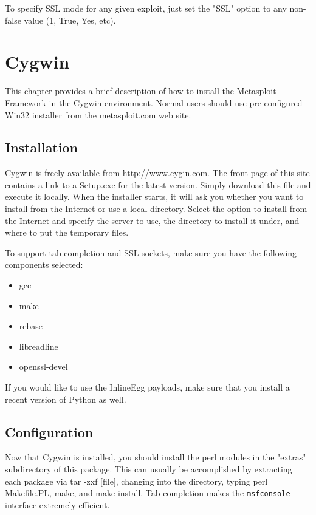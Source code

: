 \documentclass{report}
\begin{document}
\par
To specify SSL mode for any given exploit, just set the "SSL" option
to any non-false value (1, True, Yes, etc).


\pagebreak
\chapter{Cygwin}
\label{CYGWIN}	
	
\par
This chapter provides a brief description of how to install the Metasploit
Framework in the Cygwin environment. Normal users should use pre-configured
Win32 installer from the metasploit.com web site. 

	\section{Installation}
\par
Cygwin is freely available from \url{http://www.cygin.com}. The front page of
this site contains a link to a Setup.exe for the latest version. Simply
download this file and execute it locally. When the installer starts, it
will ask you whether you want to install from the Internet or use a local
directory. Select the option to install from the Internet and specify the
server to use, the directory to install it under, and where to put the
temporary files.

\par
To support tab completion and SSL sockets, make sure you have the following
components selected:

\begin{itemize}
\item gcc
\item make
\item rebase
\item libreadline
\item openssl-devel
\end{itemize}

\par
If you would like to use the InlineEgg payloads, make sure that you install a
recent version of Python as well.



	\section{Configuration}
\par
Now that Cygwin is installed, you should install the perl modules in the
"extras" subdirectory of this package. This can usually be accomplished by
extracting each package via tar -zxf [file], changing into the directory, typing
perl Makefile.PL, make, and make install. Tab completion makes the \texttt{msfconsole}
interface extremely efficient. 
\end{document}
